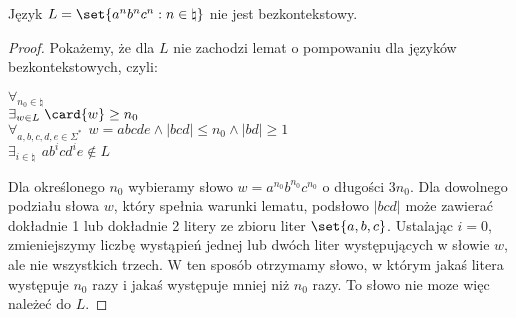 \begin{theorem}
Język \( L = \set{a^nb^nc^n : n \in \natural} \) nie jest bezkontekstowy.
\end{theorem}

\begin{proof}
Pokażemy, że dla \(L\) nie zachodzi lemat o pompowaniu dla języków bezkontekstowych, czyli:

    \( \forall_{n_0 \in \natural} \) \\
    \( \exists_{w \in L}\; \card{w} \geq n_0 \) \\
    \( \forall_{a, b, c, d, e \in \Sigma^*} \hspace{5pt} w = abcde \land |bcd| \leq n_0 \land |bd| \geq 1 \) \\
    \( \exists_{i \in \natural} \hspace{5pt} ab^{i}cd^{i}e \not\in L\)

Dla określonego \(n_0\) wybieramy słowo \(w = a^{n_0}b^{n_0}c^{n_0}\) o długości \(3n_0\). Dla dowolnego podziału słowa \(w\), który spełnia warunki lematu, podsłowo \( |bcd| \) może zawierać dokładnie 1 lub dokładnie 2 litery ze zbioru liter \( \set{a,b,c} \). Ustalając \(i=0\), zmieniejszymy liczbę wystąpień jednej lub dwóch liter występujących w słowie \( w \), ale nie wszystkich trzech.
W ten sposób otrzymamy słowo, w którym jakaś litera występuje \( n_0 \) razy i jakaś występuje mniej niż \( n_0 \) razy. To słowo nie moze więc należeć do \(L\).
\end{proof}